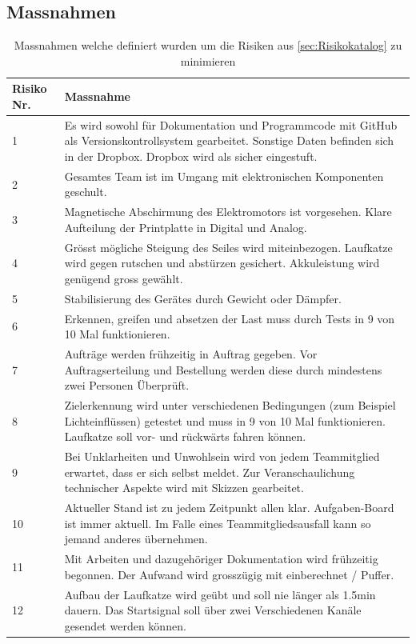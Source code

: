 \documentclass[a4paper]{report}
\begin{document}
\subsection{Massnahmen}
\label{sec:Massnahmen}
\vspace{1em}
\noindent
\begin{table}[h!]
	\centering
	\begin{tabular}{|p{}|p{}|}
		\hline
		\textbf{Risiko Nr.} & \textbf{Massnahme} \\
		\hline
		1 & Es wird sowohl für Dokumentation und Programmcode mit GitHub als Versionskontrollsystem gearbeitet. Sonstige Daten befinden sich in der Dropbox. Dropbox wird als sicher eingestuft. \\
		\hline
		2 & Gesamtes Team ist im Umgang mit elektronischen Komponenten geschult. \\
		\hline
		3 & Magnetische Abschirmung des Elektromotors ist vorgesehen. Klare Aufteilung der Printplatte in Digital und Analog. \\
		\hline
		4 & Grösst mögliche Steigung des Seiles wird miteinbezogen. Laufkatze wird gegen rutschen und abstürzen gesichert. Akkuleistung wird genügend gross gewählt. \\
		\hline
		5 & Stabilisierung des Gerätes durch Gewicht oder Dämpfer. \\
		\hline
		6 & Erkennen, greifen und absetzen der Last muss durch Tests in 9 von 10 Mal funktionieren. \\
		\hline
		7 & Aufträge werden frühzeitig in Auftrag gegeben. Vor Auftragserteilung und Bestellung werden diese durch mindestens zwei Personen Überprüft.\\
		\hline
		8 & Zielerkennung wird unter verschiedenen Bedingungen (zum Beispiel Lichteinflüssen) getestet und muss in 9 von 10 Mal funktionieren. Laufkatze soll vor- und rückwärts fahren können. \\
		\hline
		9 & Bei Unklarheiten und Unwohlsein wird von jedem Teammitglied erwartet, dass er sich selbst meldet. Zur Veranschaulichung technischer Aspekte wird mit Skizzen gearbeitet. \\
		\hline
		10 & Aktueller Stand ist zu jedem Zeitpunkt allen klar. Aufgaben-Board ist immer aktuell. Im Falle eines Teammitgliedsausfall kann so jemand anderes übernehmen. \\
		\hline
		11 & Mit Arbeiten und dazugehöriger Dokumentation wird frühzeitig begonnen. Der Aufwand wird grosszügig mit einberechnet / Puffer. \\
		\hline
		12 & Aufbau der Laufkatze wird geübt und soll nie länger als 1.5min dauern. Das Startsignal soll über zwei Verschiedenen Kanäle gesendet werden können. \\
		\hline
	\end{tabular}
	\caption{Massnahmen welche definiert wurden um die Risiken aus \ref{sec:Risikokatalog} zu minimieren}
	\label{tab:Massnahmen}
\end{table}
\end{document}
